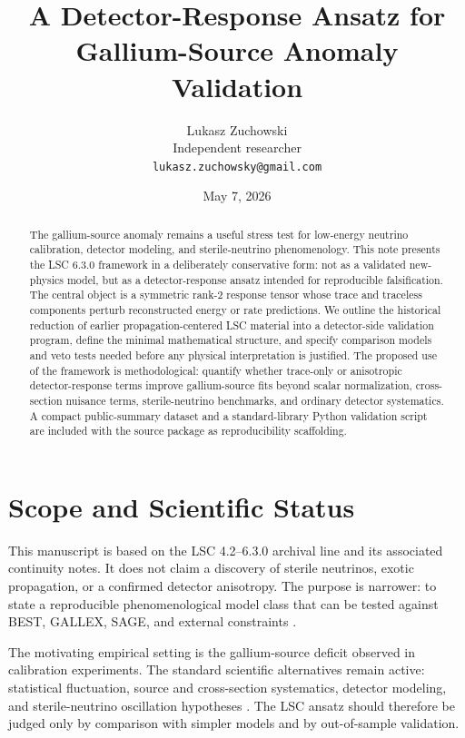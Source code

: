 \documentclass[11pt]{article}
\title{A Detector-Response Ansatz for Gallium-Source Anomaly Validation}
\author{Lukasz Zuchowski\\Independent researcher\\\texttt{lukasz.zuchowsky@gmail.com}}
\date{May 7, 2026}
\begin{document}
\maketitle

\begin{abstract}
The gallium-source anomaly remains a useful stress test for low-energy neutrino
calibration, detector modeling, and sterile-neutrino phenomenology.  This note
presents the LSC 6.3.0 framework in a deliberately conservative form: not as a
validated new-physics model, but as a detector-response ansatz intended for
reproducible falsification.  The central object is a symmetric rank-2 response
tensor whose trace and traceless components perturb reconstructed energy or rate
predictions.  We outline the historical reduction of earlier propagation-centered
LSC material into a detector-side validation program, define the minimal
mathematical structure, and specify comparison models and veto tests needed
before any physical interpretation is justified.  The proposed use of the
framework is methodological: quantify whether trace-only or anisotropic
detector-response terms improve gallium-source fits beyond scalar normalization,
cross-section nuisance terms, sterile-neutrino benchmarks, and ordinary detector
systematics.  A compact public-summary dataset and a standard-library Python
validation script are included with the source package as reproducibility
scaffolding.
\end{abstract}

\section{Scope and Scientific Status}

This manuscript is based on the LSC 4.2--6.3.0 archival line and its associated
continuity notes.  It does not claim a discovery of sterile neutrinos, exotic
propagation, or a confirmed detector anisotropy.  The purpose is narrower: to
state a reproducible phenomenological model class that can be tested against
BEST, GALLEX, SAGE, and external constraints
\cite{best2022,kaether2010,sagecr1999,sagear2006,katrin2022,icecube2020}.

The motivating empirical setting is the gallium-source deficit observed in
calibration experiments.  The standard scientific alternatives remain active:
statistical fluctuation, source and cross-section systematics, detector modeling,
and sterile-neutrino oscillation hypotheses \cite{giunti2011,best2022}.  The LSC
ansatz should therefore be judged only by comparison with simpler models and by
out-of-sample validation.
\end{document}
